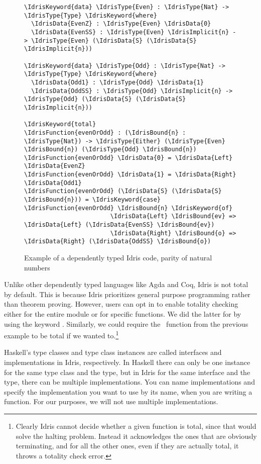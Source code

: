 \begin{figure}[ht]
\caption{Example of a dependently typed Idris code, parity of natural numbers}
\label{code:evenodd}
\begin{Verbatim}[framesep=2mm, label=\footnotesize{\normalfont{Idris}}, labelposition=topline]
\IdrisKeyword{data} \IdrisType{Even} : \IdrisType{Nat} -> \IdrisType{Type} \IdrisKeyword{where}
  \IdrisData{EvenZ} : \IdrisType{Even} \IdrisData{0}
  \IdrisData{EvenSS} : \IdrisType{Even} \IdrisImplicit{n} -> \IdrisType{Even} (\IdrisData{S} (\IdrisData{S} \IdrisImplicit{n}))

\IdrisKeyword{data} \IdrisType{Odd} : \IdrisType{Nat} -> \IdrisType{Type} \IdrisKeyword{where}
  \IdrisData{Odd1} : \IdrisType{Odd} \IdrisData{1}
  \IdrisData{OddSS} : \IdrisType{Odd} \IdrisImplicit{n} -> \IdrisType{Odd} (\IdrisData{S} (\IdrisData{S} \IdrisImplicit{n}))

\IdrisKeyword{total}
\IdrisFunction{evenOrOdd} : (\IdrisBound{n} : \IdrisType{Nat}) -> \IdrisType{Either} (\IdrisType{Even} \IdrisBound{n}) (\IdrisType{Odd} \IdrisBound{n})
\IdrisFunction{evenOrOdd} \IdrisData{0} = \IdrisData{Left} \IdrisData{EvenZ}
\IdrisFunction{evenOrOdd} \IdrisData{1} = \IdrisData{Right} \IdrisData{Odd1}
\IdrisFunction{evenOrOdd} (\IdrisData{S} (\IdrisData{S} \IdrisBound{n})) = \IdrisKeyword{case} \IdrisFunction{evenOrOdd} \IdrisBound{n} \IdrisKeyword{of}
                        \IdrisData{Left} \IdrisBound{ev} => \IdrisData{Left} (\IdrisData{EvenSS} \IdrisBound{ev})
                        \IdrisData{Right} \IdrisBound{o} => \IdrisData{Right} (\IdrisData{OddSS} \IdrisBound{o})
\end{Verbatim}
\end{figure}

Unlike other dependently typed languages like Agda and Coq, Idris is not total
by default. This is because Idris prioritizes general purpose programming
rather than theorem proving. However, users can opt in to enable totality
checking either for the entire module or for specific functions.
We did the latter for  by using the keyword .
Similarly, we could require the \zip\ function from the previous example to be
total if we wanted to.\footnote{Clearly Idris cannot decide whether a given
function is total, since that would solve the halting problem. Instead it
acknowledges the ones that are obviously terminating, and for all the other
ones, even if they are actually total, it throws a totality check error.}

Haskell's type classes and type class instances are called interfaces and
implementations in Idris, respectively. In Haskell there can only be one
instance for the same type class and the type, but in Idris for the same
interface and the type, there can be multiple implementations. You can name
implementations and specify the implementation you want to use by its name,
when you are writing a function. For our purposes, we will not use multiple
implementations.

